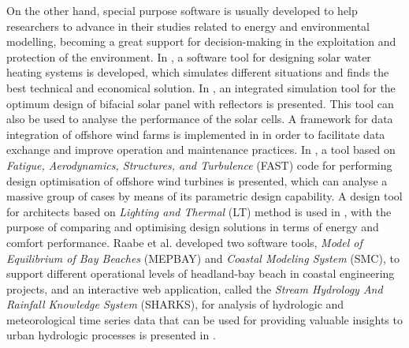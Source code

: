 \documentclass[review]{elsarticle}
\begin{document}
		On the other hand, special purpose software is usually developed to help researchers to advance in their studies related to energy and environmental modelling, becoming a great support for decision-making in the exploitation and protection of the environment. In \cite{CAMARGONOGUEIRA2016361}, a software tool for designing solar water heating systems is developed, which simulates different situations and finds the best technical and economical solution. In \cite{LO2015293}, an integrated simulation tool for the optimum design of bifacial solar panel with reflectors is presented. This tool can also be used to analyse the performance of the solar cells. A framework for data integration of offshore wind farms is implemented in \cite{NGUYEN2013150} in order to facilitate data exchange and improve operation and maintenance practices. In \cite{GUTIERREZ201369}, a tool based on \textit{Fatigue, Aerodynamics, Structures, and Turbulence} (FAST) code for performing design optimisation of offshore wind turbines is presented, which can analyse a massive group of cases by means of its parametric design capability. A design tool for architects based on \textit{Lighting and Thermal} (LT) method is used in \cite{BAKER2013156}, with the purpose of comparing and optimising design solutions in terms of energy and comfort performance. Raabe et al. \cite{RAABE2010213} developed two software tools, \textit{Model of Equilibrium of Bay Beaches} (MEPBAY) and \textit{Coastal Modeling System} (SMC), to support different operational levels of headland-bay beach in coastal engineering projects, and an interactive web application, called the \textit{Stream Hydrology And Rainfall Knowledge System} (SHARKS), for analysis of hydrologic and meteorological time series data that can be used for providing valuable insights to urban hydrologic processes is presented in \cite{BRENDEL2019}.
		
\end{document}
